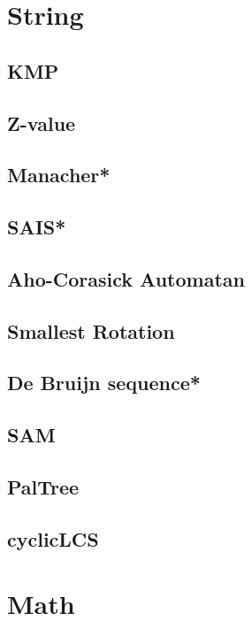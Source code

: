 \section{String}
\subsection{KMP}

\subsection{Z-value}

\subsection{Manacher*} %

\subsection{SAIS*}

\subsection{Aho-Corasick Automatan}

\subsection{Smallest Rotation}

\subsection{De Bruijn sequence*} %

\subsection{SAM}

\subsection{PalTree}

\subsection{cyclicLCS}



\section{Math}
